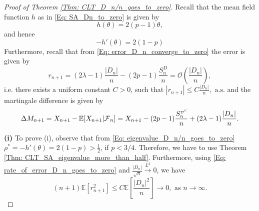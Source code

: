 \documentclass{article}
\numberwithin{equation}{section}
\newcommand{\FF}{\mbox{${\mathcal F}$}}
\newcommand{\OO}{\mbox{${\mathcal O}$}}
\newcommand{\DD}{\mbox{${\mathcal D}$}}
\newcommand{\1}{\mathbf{1}}
\newcommand{\0}{\mathbf{0}}
\newcommand{\E}{\mbox{${\mathbb E}$}}
\begin{document}
\begin{proof}[Proof of Theorem \ref{Thm: CLT_D_n/n_goes_to_zero}]
Recall that the mean field function $h$ as in \eqref{Eq: SA_Dn_to_zero} is given by 
\[
h(\theta)= 2 (p-1) \theta, 
\]
and hence 
\begin{equation}
\label{Eq: eigenvalue_D_n/n_goes_to_zero}
-h'(\theta)= 2(1-p)
\end{equation}
Furthermore, recall that from \eqref{Eq: error_D_n_converge_to_zero} the error is given by 
\begin{equation}
\label{Eq: rate_of_error_D_n_goes_to_zero}
r_{n+1}= (2\lambda-1) \frac{|D_n|}{n} - (2p-1)\frac{S_n^{D}}{n} = \OO\left(\frac{\lvert D_n\rvert}{n}\right),
\end{equation}
i.e. there exists a uniform constant $C>0$, such that $|r_{n+1}| \le C \frac{\lvert D_n\rvert}{n}, \text{ a.s.}$ and the martingale difference is given by
\begin{equation}
\label{Eq: def_martingale_difference_D_n/n_converges_zero}
\Delta M_{n+1} = X_{n+1} - \E[ X_{n+1} | \FF_n]= X_{n+1}-(2p-1) \frac{S_n^{{\tiny \DD}^c}}{n} + (2\lambda-1) \frac{|D_n|}{n}.
\end{equation}

\textbf{(i)} To prove (i), observe that from \eqref{Eq: eigenvalue_D_n/n_goes_to_zero} $\rho^*=- h'(\theta)= 2(1-p)> \frac{1}{2} $, if $p < 3/4$. Therefore, we have to use Theorem \ref{Thm: CLT_SA_eigenvalue_more_than_half}. Furthermore, using \eqref{Eq: rate_of_error_D_n_goes_to_zero} and 
$\frac{|D_n|}{\sqrt{n}}\stackrel{L^2}{\longrightarrow} 0 $, we have
\begin{equation*}
\label{Eq:rate_of_error_D_n_goes_to_zero_subdiffusive}
(n+1) \E \left[r_{n+1}^2\right]\le C \E \left[\frac{\lvert D_n \rvert^2}{n}\right]\longrightarrow 0, \text{ as } n \to \infty. 
\end{equation*}


\end{proof}
\end{document}
